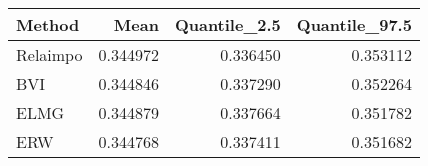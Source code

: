 \begin{table}[ht]
\centering
\begin{tabular}{lrrr}
  \hline
Method & Mean & Quantile\_2.5 & Quantile\_97.5 \\ 
  \hline
Relaimpo & 0.344972 & 0.336450 & 0.353112 \\ 
  BVI & 0.344846 & 0.337290 & 0.352264 \\ 
  ELMG & 0.344879 & 0.337664 & 0.351782 \\ 
  ERW & 0.344768 & 0.337411 & 0.351682 \\ 
   \hline
\end{tabular}
\end{table}
